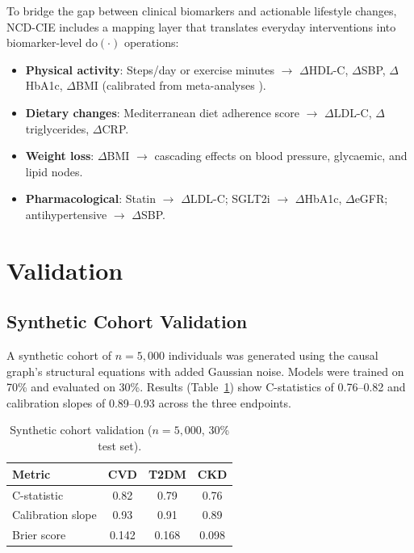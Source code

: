 \documentclass[runningheads]{llncs}
\begin{document}
To bridge the gap between clinical biomarkers and actionable lifestyle
changes, NCD-CIE includes a mapping layer that translates everyday
interventions into biomarker-level $\mathrm{do}(\cdot)$ operations:
\begin{itemize}
\item \textbf{Physical activity}: Steps/day or exercise minutes
  $\rightarrow$ $\Delta$HDL-C, $\Delta$SBP, $\Delta$HbA1c, $\Delta$BMI
  (calibrated from meta-analyses \cite{naci2018comparative}).
\item \textbf{Dietary changes}: Mediterranean diet adherence score
  $\rightarrow$ $\Delta$LDL-C, $\Delta$triglycerides, $\Delta$CRP.
\item \textbf{Weight loss}: $\Delta$BMI $\rightarrow$ cascading
  effects on blood pressure, glycaemic, and lipid nodes.
\item \textbf{Pharmacological}: Statin $\rightarrow$ $\Delta$LDL-C;
  SGLT2i $\rightarrow$ $\Delta$HbA1c, $\Delta$eGFR; antihypertensive
  $\rightarrow$ $\Delta$SBP.
\end{itemize}

\section{Validation}\label{sec:validation}

\subsection{Synthetic Cohort Validation}\label{sec:synthetic}

A synthetic cohort of $n = 5{,}000$ individuals was generated using
the causal graph's structural equations with added Gaussian noise.
Models were trained on 70\% and evaluated on 30\%.  Results
(Table~\ref{tab:synthetic}) show C-statistics of 0.76--0.82 and
calibration slopes of 0.89--0.93 across the three endpoints.

\begin{table}[t]
\centering
\caption{Synthetic cohort validation ($n = 5{,}000$, 30\% test set).}
\label{tab:synthetic}
\small
\begin{tabular}{@{}lccc@{}}
\toprule
\textbf{Metric} & \textbf{CVD} & \textbf{T2DM} & \textbf{CKD} \\
\midrule
C-statistic        & 0.82 & 0.79 & 0.76 \\
Calibration slope  & 0.93 & 0.91 & 0.89 \\
Brier score        & 0.142 & 0.168 & 0.098 \\
\bottomrule
\end{tabular}
\end{table}
\end{document}
